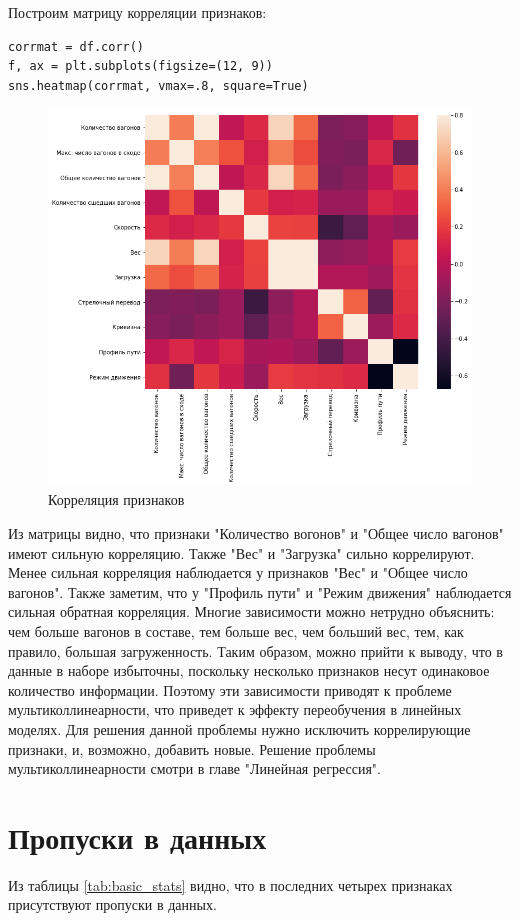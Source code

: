 Построим матрицу корреляции признаков:
\begin{verbatim}
corrmat = df.corr()
f, ax = plt.subplots(figsize=(12, 9))
sns.heatmap(corrmat, vmax=.8, square=True)
\end{verbatim}

\begin{figure}[h]
\begin{center}
\includegraphics[width=0.6\linewidth]{src/img/df_corr}
\caption{Корреляция признаков}
\label{fig:df_corr}
\end{center}
\end{figure}

Из матрицы видно, что признаки "Количество вогонов" и "Общее число вагонов" имеют сильную корреляцию. Также "Вес" и "Загрузка" сильно коррелируют. Менее сильная корреляция наблюдается у признаков "Вес" и "Общее число вагонов". Также заметим, что у "Профиль пути" и "Режим движения" наблюдается сильная обратная корреляция. Многие зависимости можно нетрудно объяснить: чем больше вагонов в составе, тем больше вес, чем больший вес, тем, как правило, большая загруженность. Таким образом, можно прийти к выводу, что в данные в наборе избыточны, поскольку несколько признаков несут одинаковое количество информации. Поэтому эти зависимости приводят к проблеме мультиколлинеарности, что приведет к эффекту переобучения в линейных моделях. Для решения данной проблемы нужно исключить коррелирующие признаки, и, возможно, добавить новые. Решение проблемы мультиколлинеарности смотри в главе "Линейная регрессия".

\section{Пропуски в данных}

Из таблицы \ref{tab:basic_stats} видно, что в последних четырех признаках присутствуют пропуски в данных.

